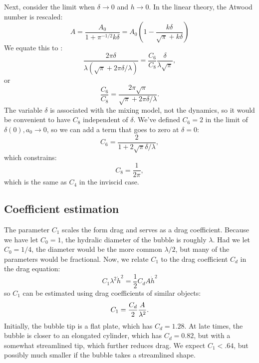 Next, consider the limit when $\delta \rightarrow 0 $ and $h \rightarrow 0$.
In the linear theory, the Atwood number is rescaled:
\begin{equation}
A = \frac{A_0}{1 + \pi^{-1/2} k \delta} = A_0 \left(1 - \frac{k \delta}{\sqrt{\pi} + k \delta}\right)
\end{equation}
We equate this to :
\begin{equation}
\frac{2 \pi \delta}{\lambda (\sqrt{\pi} + 2 \pi \delta / \lambda)} = \frac{C_6 }{C_8}\frac{\delta}{\lambda \sqrt{\pi} },
\end{equation}
or
\begin{equation}
\frac{C_6}{C_8} = \frac{2 \pi \sqrt{\pi}}{\sqrt{\pi} + 2 \pi \delta / \lambda}.
\end{equation}
The variable $\delta$ is associated with the mixing model, not the dynamics, so it would be convenient to have $C_8$ independent of $\delta$.
We've defined $C_6 = 2$ in the limit of $\delta(0), a_0 \rightarrow 0$, so we can add a term that goes to zero at $\delta = 0$:
\begin{equation}
C_6 = \frac{2}{1 + 2 \sqrt{\pi} \delta / \lambda},
\end{equation}
which constrains:
\begin{equation}
C_8 = \frac{1}{2\pi},
\end{equation}
which is the same as $C_4$ in the inviscid case.

\subsection{Coefficient estimation}

The parameter $C_1$ scales the form drag and serves as a drag coefficient.  
Because we have let $C_0 = 1$, the hydralic diameter of the bubble is roughly $\lambda$.
Had we let $C_0 = 1/4$, the diameter would be the more common $\lambda/2$, but many of the parameters would be fractional.
Now, we relate $C_1$ to the drag coefficient $C_d$ in the drag equation:
\begin{equation}
C_1 \lambda^2 \dot{h}^2 = \frac{1}{2} C_d A \dot{h}^2
\end{equation}
so $C_1$ can be estimated using drag coefficients of similar objects:
\begin{equation} \elabel{prior_c1}
C_1 = \frac{C_d}{2} \frac{A}{\lambda^2}.
\end{equation}
Initially, the bubble tip is a flat plate, which has $C_d = 1.28$.
At late times, the bubble is closer to an elongated cylinder, which has $C_d = 0.82$, but with a somewhat streamlined tip, which further reduces drag.
We expect $C_1 < .64$, but possibly much smaller if the bubble takes a streamlined shape.

